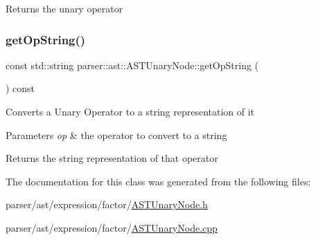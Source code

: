 \begin{DoxyReturn}{Returns}
the unary operator 
\end{DoxyReturn}
\mbox{\label{classparser_1_1ast_1_1ASTUnaryNode_ad4c36dae695c49e099bc5deed83ee7da}} 
\subsubsection{\texorpdfstring{get\+Op\+String()}{getOpString()}}
{\footnotesize\ttfamily const std\+::string parser\+::ast\+::\+A\+S\+T\+Unary\+Node\+::get\+Op\+String (\begin{DoxyParamCaption}{ }\end{DoxyParamCaption}) const}

Converts a Unary Operator to a string representation of it 
\begin{DoxyParams}{Parameters}
{\em op} & the operator to convert to a string \\
\hline
\end{DoxyParams}
\begin{DoxyReturn}{Returns}
the string representation of that operator 
\end{DoxyReturn}


The documentation for this class was generated from the following files\+:\begin{DoxyCompactItemize}
\item 
parser/ast/expression/factor/\hyperlink{ASTUnaryNode_8h}{A\+S\+T\+Unary\+Node.\+h}\item 
parser/ast/expression/factor/\hyperlink{ASTUnaryNode_8cpp}{A\+S\+T\+Unary\+Node.\+cpp}\end{DoxyCompactItemize}
